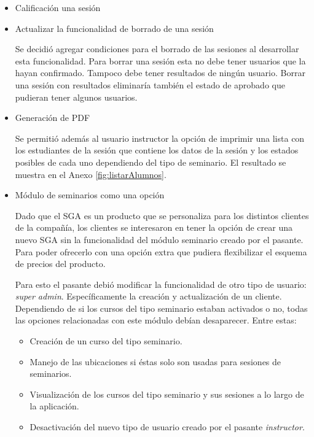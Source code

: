 \begin{itemize}

\item Calificación una sesión


\item Actualizar la funcionalidad de borrado de una sesión

Se decidió agregar condiciones para el borrado de las sesiones al desarrollar esta funcionalidad. Para borrar una sesión esta no debe tener usuarios que la hayan confirmado. Tampoco debe tener resultados de ningún usuario. Borrar una sesión con resultados eliminaría también el estado de aprobado que pudieran tener algunos usuarios.

\item Generación de PDF

Se permitió además al usuario instructor la opción de imprimir una lista con los estudiantes de la sesión que contiene los datos de la sesión y los estados posibles de cada uno dependiendo del tipo de seminario. El resultado se muestra en el Anexo \ref{fig:listarAlumnos}.


\item Módulo de seminarios como una opción

Dado que el SGA es un producto que se personaliza para los distintos clientes de la compañía, los clientes se interesaron en tener la opción de crear una nuevo SGA sin la funcionalidad del módulo seminario creado por el pasante. Para poder ofrecerlo con una opción extra que pudiera flexibilizar el esquema de precios del producto.

Para esto el pasante debió modificar la funcionalidad de otro tipo de usuario: \emph{super admin}. Específicamente la creación y actualización de un cliente. Dependiendo de si los cursos del tipo seminario estaban activados o no, todas las opciones relacionadas con este módulo debían desaparecer. Entre estas:

\begin{itemize}
	\item Creación de un curso del tipo seminario.
	\item Manejo de las ubicaciones si éstas solo son usadas para sesiones de seminarios.
	\item Visualización de los cursos del tipo seminario y sus sesiones a lo largo de la aplicación.
	\item Desactivación del nuevo tipo de usuario creado por el pasante \emph{instructor}.
\end{itemize}

\end{itemize}


